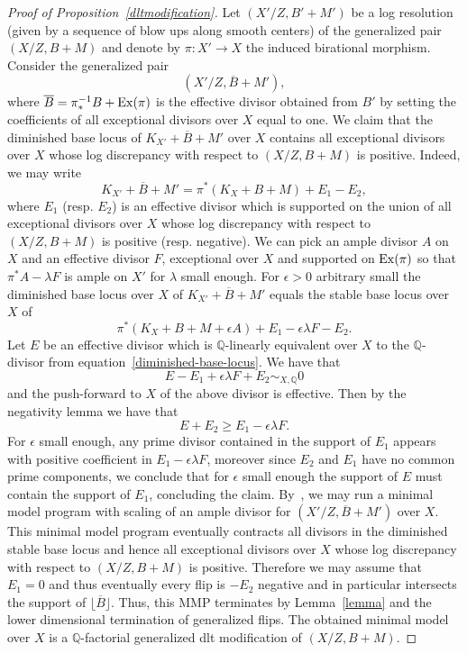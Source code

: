 \documentclass{amsart}
\newcommand{\Q}{\mathbb{Q}}
\renewcommand{\qq}{\mathbb{Q}}
\theoremstyle{remark}
\numberwithin{equation}{section}
\begin{document}
\begin{proof}[Proof of Proposition~\ref{dltmodification}]
Let $(X'/Z,B'+M')$ be a log resolution (given by a sequence of blow ups along smooth centers) of the generalized pair $(X/Z,B+M)$
and denote by $\pi \colon X'\rightarrow X$ the induced birational morphism.
Consider the generalized pair 
\[
(X'/Z, \overline{B} + M'),
\]
where $\overline{B}=\pi ^{-1}_*B+{\rm Ex}(\pi)$ is the effective divisor obtained from $B'$ by 
setting the coefficients of all exceptional divisors over $X$ equal to one.
We claim that the diminished base locus of $K_{X'}+\overline{B}+M'$ over $X$
contains all exceptional divisors over $X$ whose log discrepancy with respect to $(X/Z,B+M)$ is positive.
Indeed, we may write 
\[
K_{X'}+\overline{B}+M' = \pi^*(K_X+B+M)+E_1 - E_2, 
\]
where $E_1$ (resp. $E_2$) is an effective divisor which is supported on the union of all exceptional divisors over $X$ whose
log discrepancy with respect to $(X/Z,B+M)$ is positive (resp. negative).
We can pick an ample divisor $A$ on $X$ and an effective divisor $F$, exceptional over $X$ and supported on ${\rm Ex}(\pi)$ 
so that $\pi^*A-\lambda F$ is ample on $X'$ for $\lambda$ small enough. 
For $\epsilon>0$ arbitrary small the diminished base locus over $X$ of $K_{X'}+\overline{B}+M'$ equals the stable base locus over $X$ of 
\begin{equation}\label{diminished-base-locus}
\pi^*(K_X+B+M+\epsilon A) + E_1- \epsilon \lambda F - E_2. 
\end{equation}
Let $E$ be an effective divisor which is $\qq$-linearly equivalent over $X$ to the $\Q$-divisor from equation~\eqref{diminished-base-locus}.
We have that 
\[
E-E_1+\epsilon\lambda F +E_2 \sim_{X,\qq} 0
\]
and the push-forward to $X$ of the above divisor is effective.
Then by the negativity lemma we have that
\[
E+E_2 \geq E_1  - \epsilon \lambda F.
\]
For $\epsilon$ small enough, any prime divisor contained in the support of $E_1$
appears with positive coefficient in $E_1 -\epsilon\lambda F$,
moreover since $E_2$ and $E_1$ have no common prime components, 
we conclude that for $\epsilon$ small enough the support of $E$ must contain the support of $E_1$, concluding the claim.
By~\cite[4.4]{BZ16}, we may run a minimal model program with scaling of an ample divisor for $(X'/Z,\overline{B}+M')$ over $X$. 
This minimal model program eventually contracts all divisors in the diminished stable base locus and hence all exceptional divisors over $X$
whose log discrepancy with respect to $(X/Z,B+M)$ is positive. Therefore we may assume that $E_1=0$ and thus eventually every flip is $-E_2$ negative and in particular intersects the support of $\lfloor \overline B\rfloor$.
Thus, this MMP terminates by Lemma~\ref{lemma} and the lower dimensional termination of generalized flips.
The obtained minimal model over $X$ is a $\qq$-factorial generalized dlt modification of $(X/Z,B+M)$.
\end{proof}
\end{document}
